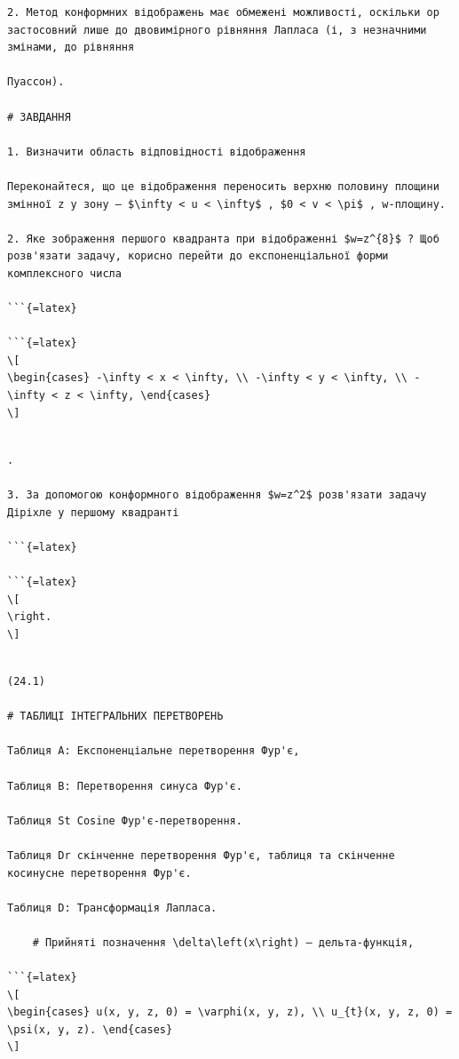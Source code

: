 \documentclass[
  ukrainian,
]{article}
\begin{document}
\begin{verbatim}
2. Метод конформних відображень має обмежені можливості, оскільки op застосовний лише до двовимірного рівняння Лапласа (і, з незначними змінами, до рівняння

Пуассон).

# ЗАВДАННЯ

1. Визначити область відповідності відображення

Переконайтеся, що це відображення переносить верхню половину площини змінної z у зону — $\infty < u < \infty$ , $0 < v < \pi$ , w-площину.

2. Яке зображення першого квадранта при відображенні $w=z^{8}$ ? Щоб розв'язати задачу, корисно перейти до експоненціальної форми комплексного числа

```{=latex}

```{=latex}
\[
\begin{cases} -\infty < x < \infty, \\ -\infty < y < \infty, \\ -\infty < z < \infty, \end{cases}
\]
\end{verbatim}

\begin{verbatim}

.

3. За допомогою конформного відображення $w=z^2$ розв'язати задачу Діріхле у першому квадранті

```{=latex}

```{=latex}
\[
\right.
\]
\end{verbatim}

\begin{verbatim}

(24.1)

# ТАБЛИЦІ ІНТЕГРАЛЬНИХ ПЕРЕТВОРЕНЬ

Таблиця A: Експоненціальне перетворення Фур'є,

Таблиця B: Перетворення синуса Фур'є.

Таблиця St Cosine Фур'є-перетворення.

Таблиця Dr скінченне перетворення Фур'є, таблиця та скінченне косинусне перетворення Фур'є.

Таблиця D: Трансформація Лапласа.

    # Прийняті позначення \delta\left(x\right) — дельта-функція,

```{=latex}
\[
\begin{cases} u(x, y, z, 0) = \varphi(x, y, z), \\ u_{t}(x, y, z, 0) = \psi(x, y, z). \end{cases}
\]
\end{verbatim}
\end{document}
